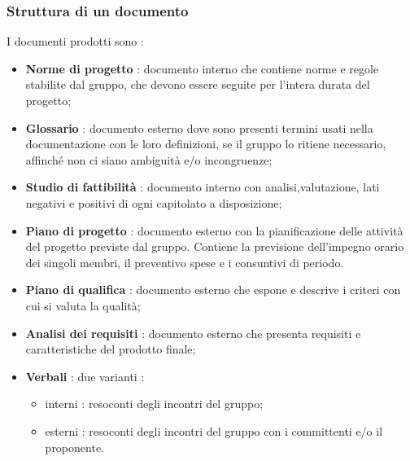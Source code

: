 \subsubsection{Struttura di un documento}
I documenti prodotti sono :
\begin{itemize}
  \item \textbf{Norme di progetto} : documento interno che contiene norme e regole stabilite dal gruppo, che devono essere seguite per l’intera durata del progetto;
  \item \textbf{Glossario} : documento esterno dove sono presenti termini usati nella documentazione con le loro definizioni, se il gruppo lo ritiene necessario, affinché non ci siano ambiguità e/o incongruenze;
  \item \textbf{Studio di fattibilità} : documento interno con analisi,valutazione, lati negativi e positivi di ogni capitolato a disposizione;
  \item \textbf{Piano di progetto} : documento esterno con la pianificazione delle attività del progetto previste dal gruppo. Contiene la previsione dell’impegno orario dei singoli membri, il preventivo spese e i consuntivi di periodo.
  \item \textbf{Piano di qualifica} : documento esterno che espone e descrive i criteri con cui si valuta la qualità;
  \item \textbf{Analisi dei requisiti} : documento esterno che presenta requisiti e caratteristiche del prodotto finale;
  \item \textbf{Verbali}  : due varianti :
  \begin{itemize}
  		\item interni  : resoconti degli incontri del gruppo;
  		\item esterni  : resoconti degli incontri del gruppo con i committenti e/o il proponente.
	\end{itemize}

\end{itemize}

